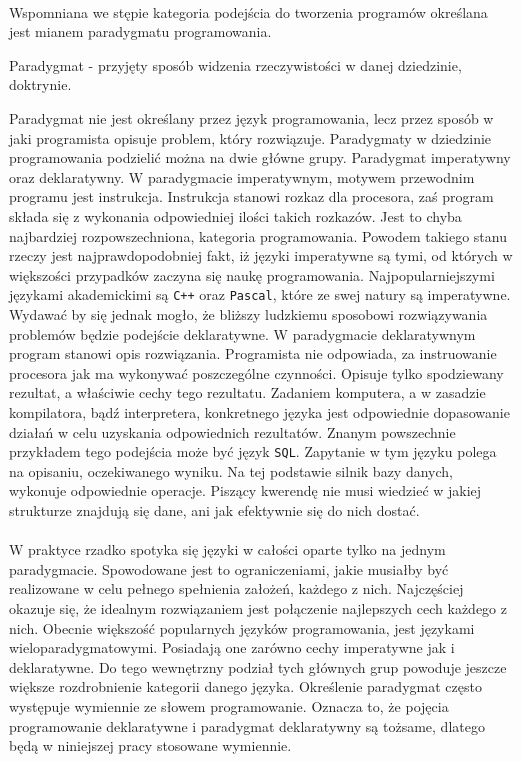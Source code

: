 \documentclass[a4paper,10pt]{report}
\begin{document}
\paragraph{}
Wspomniana we stępie kategoria podejścia do tworzenia programów określana jest mianem paradygmatu programowania.
\begin{theo}
	Paradygmat - przyjęty sposób widzenia rzeczywistości w danej dziedzinie, doktrynie.
\end{theo}
 Paradygmat nie jest określany przez język programowania, lecz przez sposób w jaki programista opisuje problem, który rozwiązuje. Paradygmaty w dziedzinie programowania podzielić można na dwie główne grupy. Paradygmat imperatywny oraz deklaratywny. W paradygmacie imperatywnym, motywem przewodnim programu jest instrukcja. Instrukcja stanowi rozkaz dla procesora, zaś program składa się z wykonania odpowiedniej ilości takich rozkazów. Jest to chyba najbardziej rozpowszechniona, kategoria programowania. Powodem takiego stanu rzeczy jest najprawdopodobniej fakt, iż języki imperatywne są tymi, od których w większości przypadków zaczyna się naukę programowania. Najpopularniejszymi językami akademickimi są \verb|C++| oraz \verb|Pascal|, które ze swej natury są imperatywne. Wydawać by się jednak mogło, że bliższy ludzkiemu sposobowi rozwiązywania problemów będzie podejście deklaratywne. W paradygmacie deklaratywnym program stanowi opis rozwiązania. Programista nie odpowiada, za instruowanie procesora jak ma wykonywać poszczególne czynności. Opisuje tylko spodziewany rezultat, a właściwie cechy tego rezultatu. Zadaniem komputera, a w zasadzie kompilatora, bądź interpretera, konkretnego języka jest odpowiednie dopasowanie działań w celu uzyskania odpowiednich rezultatów. Znanym powszechnie przykładem tego podejścia może być język \verb|SQL|. Zapytanie w tym języku polega na opisaniu, oczekiwanego wyniku. Na tej podstawie silnik bazy danych, wykonuje odpowiednie operacje. Piszący kwerendę nie musi wiedzieć w jakiej strukturze znajdują się dane, ani jak efektywnie się do nich dostać. 
 \paragraph{}
 W praktyce rzadko spotyka się języki w całości oparte tylko na jednym paradygmacie. Spowodowane jest to ograniczeniami, jakie musiałby być realizowane w celu pełnego spełnienia założeń, każdego z nich. Najczęściej okazuje się, że idealnym rozwiązaniem jest połączenie najlepszych cech każdego z nich. Obecnie większość popularnych języków programowania, jest językami wieloparadygmatowymi. Posiadają one zarówno cechy imperatywne jak i deklaratywne. Do tego wewnętrzny podział tych głównych grup powoduje jeszcze większe rozdrobnienie kategorii danego języka. Określenie paradygmat często występuje wymiennie ze słowem programowanie. Oznacza to, że pojęcia programowanie deklaratywne i paradygmat deklaratywny są tożsame, dlatego będą w niniejszej pracy stosowane wymiennie.
\end{document}
